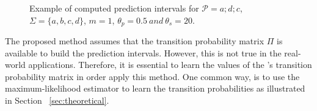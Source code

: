 \begin{figure}[!ht]
	\begin{centering}
		
	
		
		\caption{Example of computed prediction intervals for
			$\mathcal{P}=a ; d ; c$, $\Sigma=\{a,b,c,d\}$, $m=1$, $\theta_{p}=0.5\ and\ \theta_{s}=20$.}
		\label{fig:wtdfas}
	\end{centering}
\end{figure}

\par The proposed method assumes that the transition probability matrix $\Pi$ is available to build the prediction intervals. However, this is not true in the real-world applications.
Therefore, it is essential to learn the values of the \pmcmr's transition probability matrix in order apply this method. One common way, is to use the maximum-likelihood estimator to learn the transition probabilities as illustrated in Section ~\ref{sec:theoretical}. 

